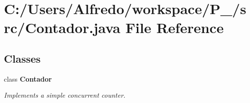 \section{C\+:/\+Users/\+Alfredo/workspace/\+P\+\_/src/\+Contador.java File Reference}
\label{_contador_8java}
\subsection*{Classes}
\begin{DoxyCompactItemize}
\item 
class {\bf Contador}
\begin{DoxyCompactList}\small\item\em Implements a simple concurrent counter. \end{DoxyCompactList}\end{DoxyCompactItemize}
